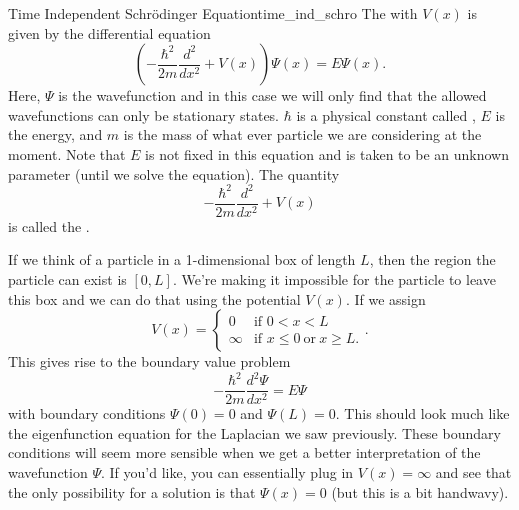 \begin{df}{Time Independent Schr\"odinger Equation}{time_ind_schro}
The  with  $V(x)$ is given by the differential equation
\[
\left(-\frac{\hbar^2}{2m}\frac{d^2}{dx^2}+V(x)\right)\Psi(x)=E\Psi(x).
\]
Here, $\Psi$ is the wavefunction and in this case we will only find that the allowed wavefunctions can only be stationary states. $\hbar$ is a physical constant called , $E$ is the energy, and $m$ is the mass of what ever particle we are considering at the moment. Note that $E$ is not fixed in this equation and is taken to be an unknown parameter (until we solve the equation). The quantity
\[
-\frac{\hbar^2}{2m}\frac{d^2}{dx^2}+V(x)
\]
is called the .
\end{df}

If we think of a particle in a 1-dimensional box of length $L$, then the region the particle can exist is $[0,L]$.  We're making it impossible for the particle to leave this box and we can do that using the potential $V(x)$. If we assign
\[
V(x)=\begin{cases} 0 & \textrm{if } 0<x<L\\
\infty & \textrm{if } x\leq 0 ~\textrm{or}~ x\geq L. \end{cases}.
\]
This gives rise to the boundary value problem
\[
-\frac{\hbar^2}{2m}\frac{d^2\Psi}{dx^2}=E\Psi
\]
with boundary conditions $\Psi(0)=0$ and $\Psi(L)=0$. This should look much like the eigenfunction equation for the Laplacian we saw previously. These boundary conditions will seem more sensible when we get a better interpretation of the wavefunction $\Psi$. If you'd like, you can essentially plug in $V(x)=\infty$ and see that the only possibility for a solution is that $\Psi(x)=0$ (but this is a bit handwavy).

